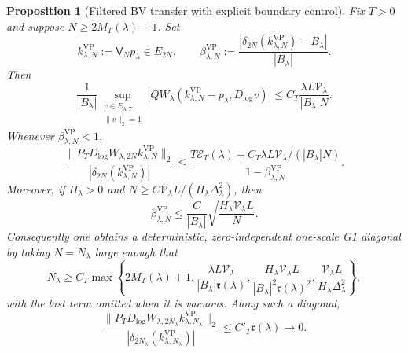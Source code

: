 \documentclass[11pt]{article}
\newtheorem{proposition}[theorem]{Proposition}
\theoremstyle{remark}
\begin{document}
\begin{proposition}[Filtered BV transfer with explicit boundary control]\label{prop:g1-vp-transfer}
Fix $T>0$ and suppose $N\ge2M_T(\lambda)+1$.  Set
\[
 k^{\mathrm{VP}}_{\lambda,N}:=\mathsf V_Np_\lambda\in E_{2N},
 \qquad
 \beta^{\mathrm{VP}}_{\lambda,N}
 :=\frac{|\delta_{2N}(k^{\mathrm{VP}}_{\lambda,N})-B_\lambda|}
 {|B_\lambda|}.
\]
Then
\begin{equation}\label{eq:g1-vp-form-defect}
 \boxed{
 \frac1{|B_\lambda|}
 \sup_{\substack{v\in E_{\lambda,T}\\\|v\|_2=1}}
 |QW_\lambda(k^{\mathrm{VP}}_{\lambda,N}-p_\lambda,
             D_{\log}v)|
 \le C_T\frac{\lambda L\mathcal V_\lambda}{|B_\lambda|N}.}
\end{equation}
Whenever $\beta^{\mathrm{VP}}_{\lambda,N}<1$,
\begin{equation}\label{eq:g1-vp-master}
 \boxed{
 \frac{\|P_TD_{\log}W_{\lambda,2N}
 k^{\mathrm{VP}}_{\lambda,N}\|_2}
 {|\delta_{2N}(k^{\mathrm{VP}}_{\lambda,N})|}
 \le
 \frac{T\mathcal E_T(\lambda)
 +C_T\lambda L\mathcal V_\lambda/(|B_\lambda|N)}
 {1-\beta^{\mathrm{VP}}_{\lambda,N}}.}
\end{equation}
Moreover, if $H_\lambda>0$ and
$N\ge C\mathcal V_\lambda L/(H_\lambda\Delta_\lambda^2)$, then
\begin{equation}\label{eq:g1-vp-beta-rate}
 \boxed{
 \beta^{\mathrm{VP}}_{\lambda,N}
 \le
 \frac{C}{|B_\lambda|}
 \sqrt{\frac{H_\lambda\mathcal V_\lambda L}{N}}.}
\end{equation}
Consequently one obtains a deterministic, zero-independent one-scale G1
diagonal by taking $N=N_\lambda$ large enough that
\begin{equation}\label{eq:g1-vp-cutoff}
 N_\lambda\ge C_T\max\left\{
 2M_T(\lambda)+1,
 \frac{\lambda L\mathcal V_\lambda}
      {|B_\lambda|\mathfrak r(\lambda)},
 \frac{H_\lambda\mathcal V_\lambda L}
      {|B_\lambda|^2\mathfrak r(\lambda)^2},
 \frac{\mathcal V_\lambda L}{H_\lambda\Delta_\lambda^2}
 \right\},
\end{equation}
with the last term omitted when it is vacuous.  Along such a diagonal,
\begin{equation}\label{eq:g1-vp-vanishing}
 \boxed{
 \frac{\|P_TD_{\log}W_{\lambda,2N_\lambda}
 k^{\mathrm{VP}}_{\lambda,N_\lambda}\|_2}
 {|\delta_{2N_\lambda}(k^{\mathrm{VP}}_{\lambda,N_\lambda})|}
 \le C'_T\mathfrak r(\lambda)\longrightarrow0.}
\end{equation}
\end{proposition}
\end{document}
